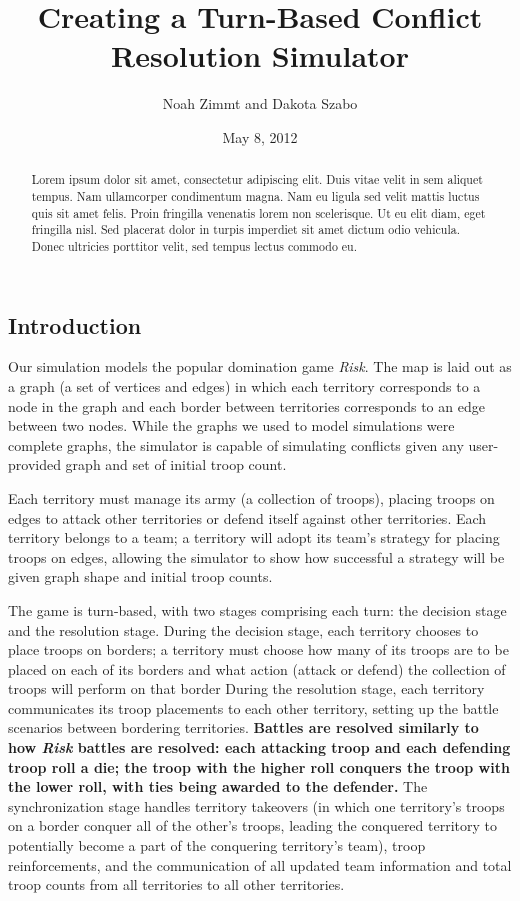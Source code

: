 \documentclass[10pt]{article}
\title{
	\textbf{
		Creating a Turn-Based Conflict Resolution Simulator
	}
}
\author{Noah Zimmt and Dakota Szabo}
\date{May 8, 2012}
\begin{document}
	\maketitle
	\begin{abstract}
		Lorem ipsum dolor sit amet, consectetur adipiscing elit. Duis vitae velit in sem aliquet tempus. Nam ullamcorper condimentum magna. Nam eu ligula sed velit mattis luctus quis sit amet felis. Proin fringilla venenatis lorem non scelerisque. Ut eu elit diam, eget fringilla nisl. Sed placerat dolor in turpis imperdiet sit amet dictum odio vehicula. Donec ultricies porttitor velit, sed tempus lectus commodo eu.
	\end{abstract}

	\begin{multicols}{2}
		\section*{Introduction}
		
		Our simulation models the popular domination game \emph{Risk}. 
		The map is laid out as a graph (a set of vertices and edges) in which each territory corresponds to a node in the graph and each border between territories corresponds to an edge between two nodes. 
		While the graphs we used to model simulations were complete graphs, the simulator is capable of simulating conflicts given any user-provided graph and set of initial troop count.  

		Each territory must manage its army (a collection of troops), placing troops on edges to attack other territories or defend itself against other territories. 
		Each territory belongs to a team; a territory will adopt its team's strategy for placing troops on edges, allowing the simulator to show how successful a strategy will be given graph shape and initial troop counts.

		The game is turn-based, with two stages comprising each turn: the decision stage and the resolution stage. 
		During the decision stage, each territory chooses to place troops on borders; a territory must choose how many of its troops are to be placed on each of its borders and what action (attack or defend) the collection of troops will perform on that border 
		During the resolution stage, each territory communicates its troop placements to each other territory, setting up the battle scenarios between bordering territories.  
		\textbf{Battles are resolved similarly to how \emph{Risk} battles are resolved: each attacking troop and each defending troop roll a die; the troop with the higher roll conquers the troop with the lower roll, with ties being awarded to the defender.}
		The synchronization stage handles territory takeovers (in which one territory's troops on a border conquer all of the other's troops, leading the conquered territory to potentially become a part of the conquering territory's team), troop reinforcements, and the communication of all updated team information and total troop counts from all territories to all other territories.


\end{multicols}
\end{document}
